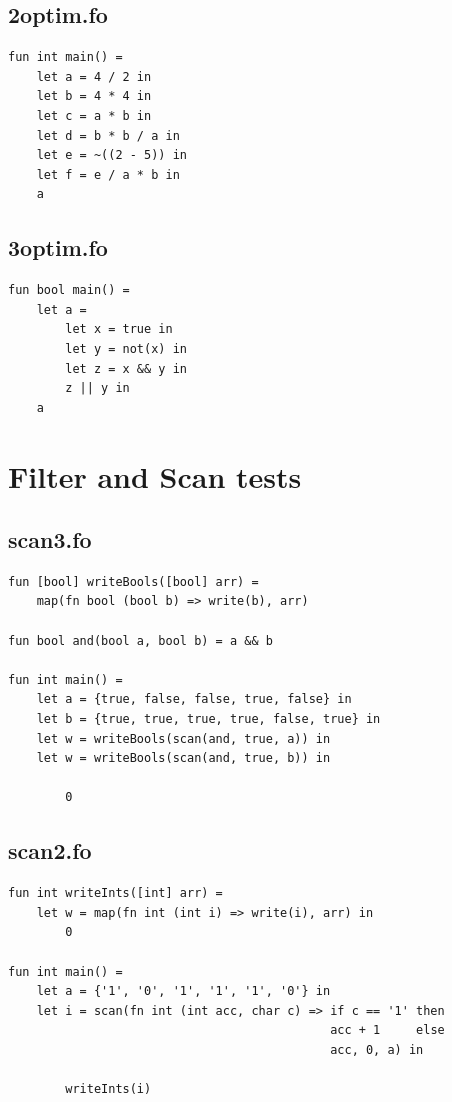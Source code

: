 \documentclass[11pt]{article}
\begin{document}
    \subsection{2optim.fo}
    \begin{lstlisting}
fun int main() =
    let a = 4 / 2 in
    let b = 4 * 4 in
    let c = a * b in
    let d = b * b / a in
    let e = ~((2 - 5)) in
    let f = e / a * b in
    a
    \end{lstlisting}

    \subsection{3optim.fo}
    \begin{lstlisting}
fun bool main() =
    let a =
        let x = true in
        let y = not(x) in
        let z = x && y in
        z || y in
    a
    \end{lstlisting}

    \newpage
    \section{Filter and Scan tests} \label{filter_scan_tests}
    \subsection{scan3.fo}
    \begin{lstlisting}
fun [bool] writeBools([bool] arr) =
    map(fn bool (bool b) => write(b), arr)

fun bool and(bool a, bool b) = a && b

fun int main() =
    let a = {true, false, false, true, false} in
    let b = {true, true, true, true, false, true} in
    let w = writeBools(scan(and, true, a)) in
    let w = writeBools(scan(and, true, b)) in

        0
    \end{lstlisting}

    \subsection{scan2.fo}
    \begin{lstlisting}
fun int writeInts([int] arr) =
    let w = map(fn int (int i) => write(i), arr) in
        0

fun int main() =
    let a = {'1', '0', '1', '1', '1', '0'} in
    let i = scan(fn int (int acc, char c) => if c == '1' then
                                             acc + 1     else
                                             acc, 0, a) in

        writeInts(i)
    \end{lstlisting}
\end{document}
